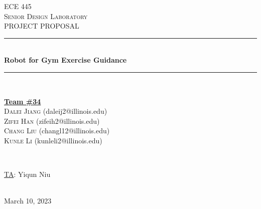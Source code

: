 \documentclass[12pt]{article}
\begin{document}
\begin{titlepage}
\newcommand{\HRule}{\rule{\linewidth}{0.1mm}} 
\center %
 
\textsc{\Large ECE 445}\\[0.5cm] %
\textsc{\large Senior Design Laboratory}\\[0.5cm] %
\textsc{\Large PROJECT PROPOSAL }\\[0.5cm] %

\HRule \\[0.5cm]
\huge \textbf{Robot for Gym Exercise Guidance} %
\HRule \\[2cm]
 
\begin{minipage}{0.5\textwidth}
    \begin{center} \large
        \underline{\textbf{Team \#34}} \\ \medskip
        \textsc{Dalei Jiang} (daleij2@illinois.edu) \\
        \textsc{Zifei Han} (zifeih2@illinois.edu) \\
        \textsc{Chang Liu} (changl12@illinois.edu) \\
        \textsc{Kunle Li} (kunleli2@illinois.edu) \\
    \end{center}
\end{minipage} \\[1.5cm]

\begin{minipage}{0.5\textwidth}
    \begin{center}
        \large
        \underline{TA}: Yiqun Niu
    \end{center}
\end{minipage} \\[1cm]

{\large March 10, 2023} %

\vfill %

\end{titlepage}
\clearpage
\tableofcontents
\end{document}
